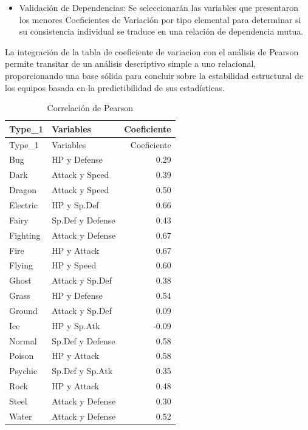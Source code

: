 \documentclass[oneside,11pt]{Latex/Classes/PhDthesisPSnPDF}
\begin{document}
\begin{itemize}

\item{Validación de Dependencias: Se seleccionarán las variables que presentaron los menores Coeficientes de Variación por tipo elemental para determinar si su consistencia individual se traduce en una relación de dependencia mutua.}

\end{itemize}

La integración de la tabla de coeficiente de variacion con el análisis
de Pearson permite transitar de un análisis descriptivo simple a uno
relacional, proporcionando una base sólida para concluir sobre la
estabilidad estructural de los equipos basada en la predictibilidad de
sus estadísticas.

\begin{longtable}[]{@{}llr@{}}
\caption{Correlación de Pearson}\tabularnewline
\toprule\noalign{}
Type\_1 & Variables & Coeficiente \\
\midrule\noalign{}
\endfirsthead
\toprule\noalign{}
Type\_1 & Variables & Coeficiente \\
\midrule\noalign{}
\endhead
\bottomrule\noalign{}
\endlastfoot
Bug & HP y Defense & 0.29 \\
Dark & Attack y Speed & 0.39 \\
Dragon & Attack y Speed & 0.50 \\
Electric & HP y Sp.Def & 0.66 \\
Fairy & Sp.Def y Defense & 0.43 \\
Fighting & Attack y Defense & 0.67 \\
Fire & HP y Attack & 0.67 \\
Flying & HP y Speed & 0.60 \\
Ghost & Attack y Sp.Def & 0.38 \\
Grass & HP y Defense & 0.54 \\
Ground & Attack y Sp.Def & 0.09 \\
Ice & HP y Sp.Atk & -0.09 \\
Normal & Sp.Def y Defense & 0.58 \\
Poison & HP y Attack & 0.58 \\
Psychic & Sp.Def y Sp.Atk & 0.35 \\
Rock & HP y Attack & 0.48 \\
Steel & Attack y Defense & 0.30 \\
Water & Attack y Defense & 0.52 \\
\end{longtable}
\end{document}
